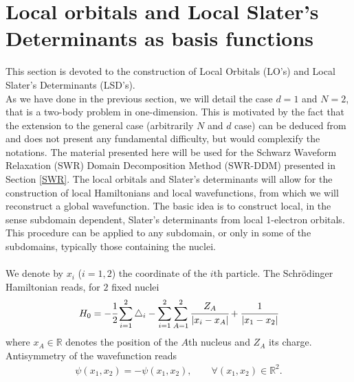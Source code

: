 \documentclass[11pt]{elsarticle}
\newcommand{\R} {\ensuremath{\mathbb{R}}}
\begin{document}
\section{Local orbitals and Local Slater's Determinants as basis functions}\label{1D-2E}
This section is devoted to the construction of Local Orbitals (LO's) and Local Slater's Determinants (LSD's).\\
As we have done in the previous section, we will detail the case $d=1$ and $N=2$, that is a two-body problem in one-dimension. This is motivated by the fact that the extension to the general case (arbitrarily $N$ and $d$ case) can be deduced from \cite{CAM15-09,CAM15-10} and does not present any fundamental difficulty, but would complexify the notations.  The material presented here will be used for the Schwarz Waveform Relaxation (SWR) Domain Decomposition Method (SWR-DDM) presented in Section \ref{SWR}. The local orbitals and Slater's determinants will allow for the construction of local Hamiltonians and local wavefunctions, from which we will reconstruct a global wavefunction. The basic idea is to construct local, in the sense subdomain dependent, Slater's determinants from local 1-electron orbitals. This procedure can be applied to any subdomain, or only in some of the subdomains, typically those containing the nuclei. \\
\\
We denote by $x_i$ ($i=1,2$) the coordinate of the $i$th particle. The Schr\"odinger Hamiltonian reads, for $2$ fixed nuclei
\begin{eqnarray*}
H_0 = -\cfrac{1}{2}\sum_{i=1}^2\triangle_i -\sum_{i=1}^2\sum_{A=1}^2\cfrac{Z_A}{|x_i-x_A|} + \cfrac{1}{|x_1-x_2|}
\end{eqnarray*}
where $x_A \in \R$ denotes the position of the $A$th nucleus and $Z_A$ its charge. Antisymmetry of the wavefunction reads
\begin{eqnarray*}
\psi(x_1,x_2) = -\psi(x_1,x_2), \qquad \forall (x_1,x_2) \in \R^2.
\end{eqnarray*}
\end{document}

